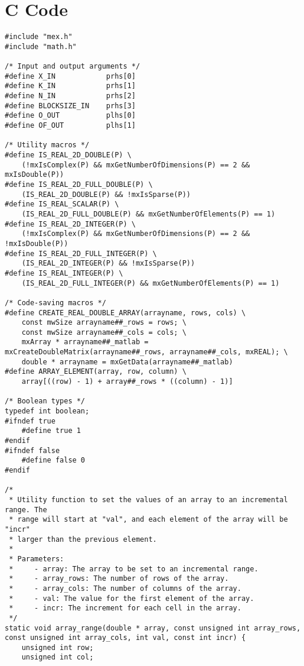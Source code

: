 \chapter{C Code}
\label{apdx:cCode}
\lstset{language=C}
\begin{lstlisting}
#include "mex.h"
#include "math.h"

/* Input and output arguments */
#define X_IN            prhs[0]
#define K_IN            prhs[1]
#define N_IN            prhs[2]
#define BLOCKSIZE_IN    prhs[3]
#define O_OUT           plhs[0]
#define OF_OUT          plhs[1]

/* Utility macros */
#define IS_REAL_2D_DOUBLE(P) \
    (!mxIsComplex(P) && mxGetNumberOfDimensions(P) == 2 && mxIsDouble(P))
#define IS_REAL_2D_FULL_DOUBLE(P) \
    (IS_REAL_2D_DOUBLE(P) && !mxIsSparse(P))
#define IS_REAL_SCALAR(P) \
    (IS_REAL_2D_FULL_DOUBLE(P) && mxGetNumberOfElements(P) == 1)
#define IS_REAL_2D_INTEGER(P) \
    (!mxIsComplex(P) && mxGetNumberOfDimensions(P) == 2 && !mxIsDouble(P))
#define IS_REAL_2D_FULL_INTEGER(P) \
    (IS_REAL_2D_INTEGER(P) && !mxIsSparse(P))
#define IS_REAL_INTEGER(P) \
    (IS_REAL_2D_FULL_INTEGER(P) && mxGetNumberOfElements(P) == 1)

/* Code-saving macros */
#define CREATE_REAL_DOUBLE_ARRAY(arrayname, rows, cols) \
    const mwSize arrayname##_rows = rows; \
    const mwSize arrayname##_cols = cols; \
    mxArray * arrayname##_matlab = mxCreateDoubleMatrix(arrayname##_rows, arrayname##_cols, mxREAL); \
    double * arrayname = mxGetData(arrayname##_matlab)
#define ARRAY_ELEMENT(array, row, column) \
    array[((row) - 1) + array##_rows * ((column) - 1)]
    
/* Boolean types */
typedef int boolean;
#ifndef true
	#define true 1
#endif
#ifndef false
	#define false 0
#endif

/*
 * Utility function to set the values of an array to an incremental range. The 
 * range will start at "val", and each element of the array will be "incr" 
 * larger than the previous element.
 *
 * Parameters:
 *     - array: The array to be set to an incremental range.
 *     - array_rows: The number of rows of the array.
 *     - array_cols: The number of columns of the array.
 *     - val: The value for the first element of the array.
 *     - incr: The increment for each cell in the array.
 */
static void array_range(double * array, const unsigned int array_rows, const unsigned int array_cols, int val, const int incr) {
    unsigned int row;
    unsigned int col;


\end{lstlisting}
